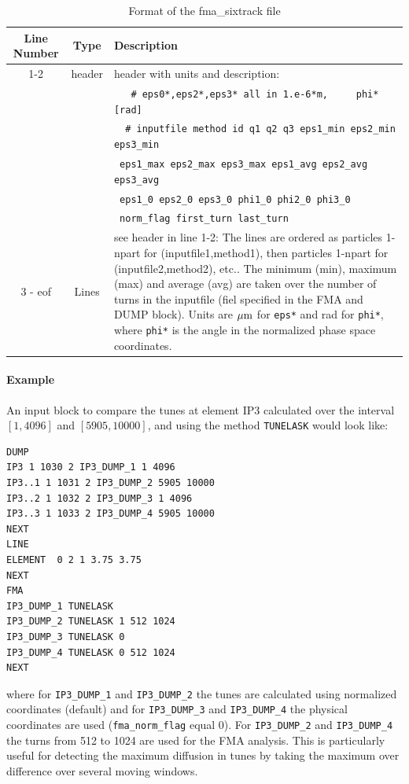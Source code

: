 \begin{table}[H]
	\begin{center}
		\caption{Format of the fma\_sixtrack file}\label{fma:tab:3}
		\begin{tabularx}{\textwidth}{|c|c|X|}
			\hline
			{\bf Line Number} & {\bf Type} & {\bf Description} \\
			\hline
			1-2 & header & header with units and description:\\
			& & \verb|   # eps0*,eps2*,eps3* all in 1.e-6*m,     phi* [rad] | \\
			& & \verb|  # inputfile method id q1 q2 q3 eps1_min eps2_min eps3_min | \\
			& & \quad \verb| eps1_max eps2_max eps3_max eps1_avg eps2_avg eps3_avg |\\
			& & \quad \verb| eps1_0 eps2_0 eps3_0 phi1_0 phi2_0 phi3_0| \\
			& & \quad \verb| norm_flag first_turn last_turn|\\\hline
			3 - eof & Lines & see header in line 1-2: The lines are ordered as particles 1-npart for (inputfile1,method1), then  particles 1-npart for (inputfile2,method2), etc.. The minimum (min), maximum (max) and average (avg) are taken over the number of turns in the inputfile (fiel specified in the FMA and DUMP block). Units are $\mu \rm m$ for \verb|eps*| and rad for \verb|phi*|, where \verb|phi*| is the angle in the normalized phase space coordinates.\\\hline
		\end{tabularx}
	\end{center}
\end{table}
\paragraph{Example}
An input block to compare the tunes at element IP3 calculated over the interval $[1,4096]$ and $[5905,10000]$, and using the method \verb|TUNELASK| would look like:
\begin{verbatim}
DUMP
IP3 1 1030 2 IP3_DUMP_1 1 4096
IP3..1 1 1031 2 IP3_DUMP_2 5905 10000
IP3..2 1 1032 2 IP3_DUMP_3 1 4096
IP3..3 1 1033 2 IP3_DUMP_4 5905 10000
NEXT
LINE
ELEMENT  0 2 1 3.75 3.75
NEXT
FMA
IP3_DUMP_1 TUNELASK
IP3_DUMP_2 TUNELASK 1 512 1024
IP3_DUMP_3 TUNELASK 0
IP3_DUMP_4 TUNELASK 0 512 1024
NEXT
\end{verbatim}
where for \verb|IP3_DUMP_1| and \verb|IP3_DUMP_2| the tunes are calculated using normalized coordinates (default) and for \verb|IP3_DUMP_3| and \verb|IP3_DUMP_4| the physical coordinates are used (\verb|fma_norm_flag| equal 0). For \verb|IP3_DUMP_2| and \verb|IP3_DUMP_4| the turns from 512 to 1024 are used for the FMA analysis. This is particularly useful for detecting the maximum diffusion in tunes by taking the maximum over difference over several moving windows.


